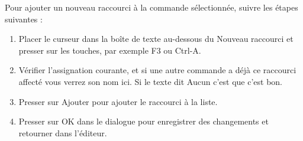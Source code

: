 Pour ajouter un nouveau raccourci à la commande sélectionnée, suivre les étapes suivantes :

\begin{enumerate}
\item Placer le curseur dans la boîte de texte au-dessous du Nouveau raccourci et presser sur les touches, par exemple F3 ou Ctrl-A.
\item Vérifier l'assignation courante, et si une autre commande a déjà ce raccourci affecté vous verrez son nom ici. Si le texte dit Aucun c'est que c'est bon.
\item Presser sur Ajouter pour ajouter le raccourci à la liste.
\item Presser sur OK dans le dialogue pour enregistrer des changements et retourner dans l'éditeur.
\end{enumerate}




